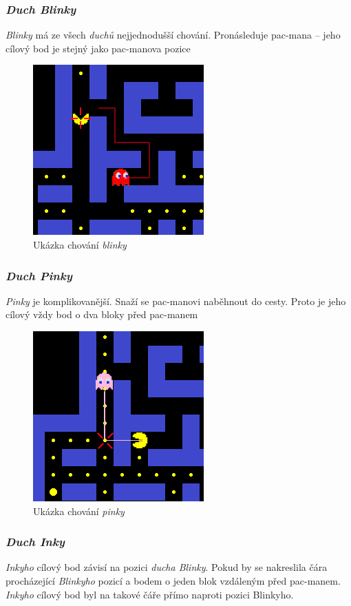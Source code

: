 \documentclass[czech]{pyt-report}
\begin{document}
\subsubsection{\textit{Duch Blinky}}
\textit{Blinky} má ze všech \textit{duchů} nejjednodušší chování. Pronásleduje pac-mana – jeho cílový bod je stejný jako pac-manova pozice

\begin{figure}[h]
  \centering\leavevmode
  \includegraphics[width=.5\linewidth]{img/blinky_ai.png}
  \caption{Ukázka chování \textit{blinky}}
  \label{fig:par-y}
\end{figure}
\FloatBarrier
\subsubsection{\textit{Duch Pinky}}
\textit{Pinky} je komplikovanější. Snaží se pac-manovi naběhnout do cesty. Proto je jeho cílový vždy bod o dva bloky před pac-manem

\begin{figure}[h]
  \centering\leavevmode
  \includegraphics[width=.5\linewidth]{img/pinky_ai.png}
  \caption{Ukázka chování \textit{pinky}}
  \label{fig:par-y}
\end{figure}
\FloatBarrier
\subsubsection{\textit{Duch Inky}}
\textit{Inkyho} cílový bod závisí na pozici \textit{ducha Blinky}. Pokud by se nakreslila čára procházející \textit{Blinkyho} pozicí a bodem o jeden blok vzdáleným před pac-manem. \textit{Inkyho} cílový bod byl na takové čáře přímo naproti pozici Blinkyho.
\end{document}
